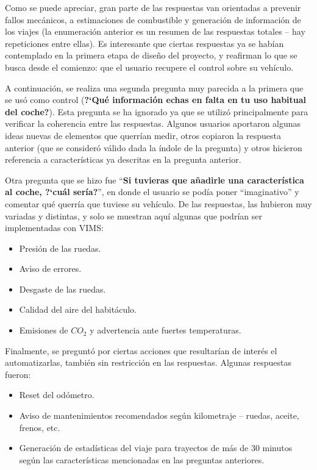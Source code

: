 Como se puede apreciar, gran parte de las respuestas van orientadas a prevenir fallos
mecánicos, a estimaciones de combustible y generación de información de los viajes
(la enumeración anterior es un resumen de las respuestas totales -- hay repeticiones
entre ellas). Es interesante que ciertas respuestas ya se habían contemplado en
la primera etapa de diseño del proyecto, y reafirman lo que se busca desde el
comienzo: que el usuario recupere el control sobre su vehículo.

A continuación, se realiza una segunda pregunta muy parecida a la primera que se usó
como control (\textbf{?`Qué información echas en falta en tu uso habitual del coche?}).
Esta pregunta se ha ignorado ya que se utilizó principalmente para verificar la
coherencia entre las respuestas. Algunos usuarios aportaron algunas ideas nuevas
de elementos que querrían medir, otros copiaron la respuesta anterior (que se
consideró válido dada la índole de la pregunta) y otros hicieron referencia a
características ya descritas en la pregunta anterior.

Otra pregunta que se hizo fue ``\textbf{Si tuvieras que añadirle una característica al
coche, ?`cuál sería?}'', en donde el usuario se podía poner ``imaginativo'' y comentar
qué querría que tuviese su vehículo. De las respuestas, las hubieron muy variadas
y distintas, y solo se muestran aquí algunas que podrían ser implementadas con
\ac{VIMS}:

\begin{itemize}
  \item Presión de las ruedas.
  \item Aviso de errores.
  \item Desgaste de las ruedas.
  \item Calidad del aire del habitáculo.
  \item Emisiones de $CO_2$ y advertencia ante fuertes temperaturas.
\end{itemize}

Finalmente, se preguntó por ciertas acciones que resultarían de interés el
automatizarlas, también sin restricción en las respuestas. Algunas respuestas
fueron:

\begin{itemize}
  \item Reset del odómetro.
  \item Aviso de mantenimientos recomendados según kilometraje -- ruedas, aceite, frenos, etc.
  \item Generación de estadísticas del viaje para trayectos de más de 30 minutos según
        las características mencionadas en las preguntas anteriores.
\end{itemize}


